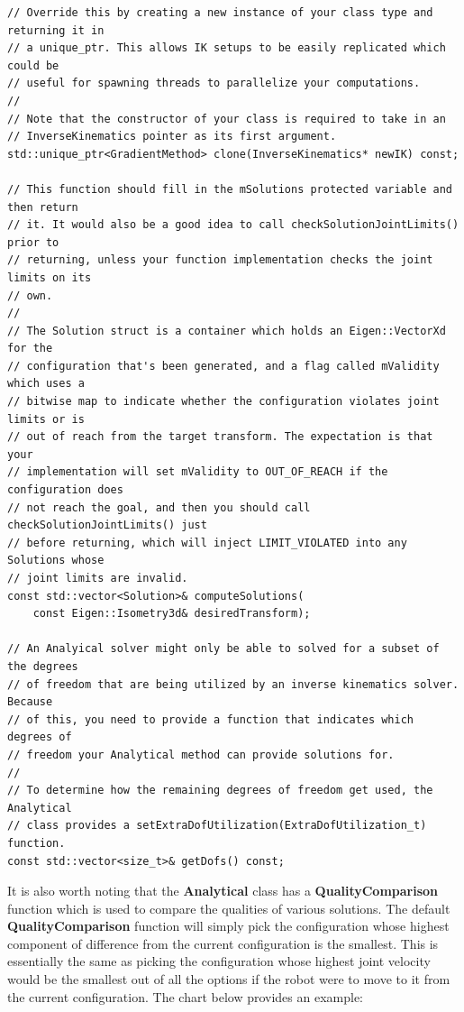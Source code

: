 \begin{lstlisting}
// Override this by creating a new instance of your class type and returning it in
// a unique_ptr. This allows IK setups to be easily replicated which could be 
// useful for spawning threads to parallelize your computations.
//
// Note that the constructor of your class is required to take in an 
// InverseKinematics pointer as its first argument.
std::unique_ptr<GradientMethod> clone(InverseKinematics* newIK) const;

// This function should fill in the mSolutions protected variable and then return
// it. It would also be a good idea to call checkSolutionJointLimits() prior to
// returning, unless your function implementation checks the joint limits on its
// own.
//
// The Solution struct is a container which holds an Eigen::VectorXd for the
// configuration that's been generated, and a flag called mValidity which uses a
// bitwise map to indicate whether the configuration violates joint limits or is
// out of reach from the target transform. The expectation is that your 
// implementation will set mValidity to OUT_OF_REACH if the configuration does
// not reach the goal, and then you should call checkSolutionJointLimits() just
// before returning, which will inject LIMIT_VIOLATED into any Solutions whose
// joint limits are invalid.
const std::vector<Solution>& computeSolutions(
    const Eigen::Isometry3d& desiredTransform);

// An Analyical solver might only be able to solved for a subset of the degrees
// of freedom that are being utilized by an inverse kinematics solver. Because
// of this, you need to provide a function that indicates which degrees of
// freedom your Analytical method can provide solutions for.
//
// To determine how the remaining degrees of freedom get used, the Analytical
// class provides a setExtraDofUtilization(ExtraDofUtilization_t) function.
const std::vector<size_t>& getDofs() const;
\end{lstlisting}

It is also worth noting that the \textbf{Analytical} class has a \textbf{QualityComparison} function which is used to compare the qualities of various solutions. The default \textbf{QualityComparison} function will simply pick the configuration whose highest component of difference from the current configuration is the smallest. This is essentially the same as picking the configuration whose highest joint velocity would be the smallest out of all the options if the robot were to move to it from the current configuration. The chart below provides an example:

